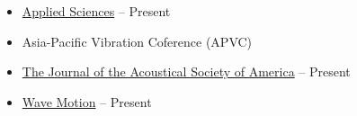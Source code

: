\documentclass[10pt,a4paper,ragged2e,withhyper]{altacv}
\newcommand{\hrefhl}[2]{{\color{accent}\href{#1}{#2}}}
\begin{document}
\begin{paracol}{1}
\begin{itemize}
    \item \hrefhl{https://www.mdpi.com/journal/applsci}{Applied Sciences} \hfill {} -- Present

    \item Asia-Pacific Vibration Coference (APVC) \hfill {}

    \item \hrefhl{https://asa.scitation.org/journal/jas}{The Journal of the Acoustical Society of America} \hfill {} -- Present

    \item \hrefhl{https://www.sciencedirect.com/journal/wave-motion}{Wave Motion} \hfill {} -- Present

\end{itemize}


\end{paracol}
\end{document}
